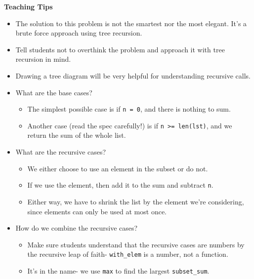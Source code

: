 \begin{blocksection}
\begin{guide}
  \textbf{Teaching Tips}
  \begin{itemize}
    \item The solution to this problem is not the smartest nor the most elegant. It's a brute force approach using tree recursion.
    \item Tell students not to overthink the problem and approach it with tree recursion in mind.
    \item Drawing a tree diagram will be very helpful for understanding recursive calls.
    \item What are the base cases?
    \begin{itemize}
      \item The simplest possible case is if \lstinline{n = 0}, and there is nothing to sum.
      \item Another case (read the spec carefully!) is if \lstinline{n >= len(lst)}, and we return the sum of the whole list.
    \end{itemize}
    \item What are the recursive cases?
    \begin{itemize}
      \item We either choose to use an element in the subset or do not.
      \item If we use the element, then add it to the sum and subtract \lstinline{n}.
      \item Either way, we have to shrink the list by the element we're considering, since elements can only be used at most once.
    \end{itemize}
    \item How do we combine the recursive cases?
    \begin{itemize}
      \item Make sure students understand that the recursive cases are numbers by the recursive leap of faith- \lstinline{with_elem} is a number, not a function.
      \item It's in the name- we use \lstinline{max} to find the largest \lstinline{subset_sum}.
    \end{itemize}
  \end{itemize}
\end{guide}
\end{blocksection}
